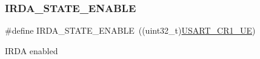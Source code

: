 \subsubsection{\texorpdfstring{I\+R\+D\+A\+\_\+\+S\+T\+A\+T\+E\+\_\+\+E\+N\+A\+B\+LE}{IRDA\_STATE\_ENABLE}}
{\footnotesize\ttfamily \#define I\+R\+D\+A\+\_\+\+S\+T\+A\+T\+E\+\_\+\+E\+N\+A\+B\+LE~((uint32\+\_\+t)\hyperlink{group___peripheral___registers___bits___definition_ga2bb650676aaae4a5203f372d497d5947}{U\+S\+A\+R\+T\+\_\+\+C\+R1\+\_\+\+UE})}

I\+R\+DA enabled 